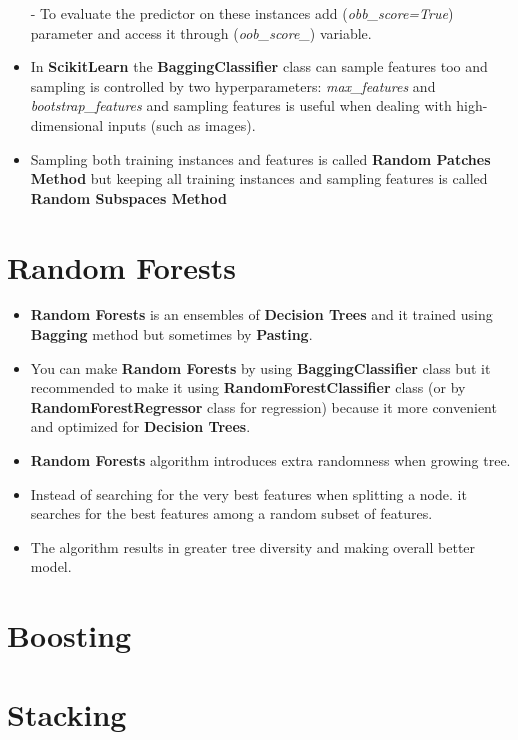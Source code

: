 \documentclass{article}
\begin{document}
\begin{itemize}
    	- To evaluate the predictor on these instances add (\textit{obb\_score=True}) parameter and access it through (\textit{oob\_score\_}) variable.
    	\item In \textbf{Scikit\textendash Learn} the \textbf{BaggingClassifier} class can sample features too and sampling is controlled by two hyperparameters: \textit{max\_features} and \textit{bootstrap\_features} and sampling features is useful when dealing with high-dimensional inputs (such as images).
    	\item Sampling both training instances and features is called \textbf{Random Patches Method} but keeping all training instances and sampling features is called \textbf{Random Subspaces Method}
    	
    \end{itemize}
    \section{Random Forests} 
    \begin{itemize}
		\item \textbf{Random Forests} is an ensembles of \textbf{Decision Trees} and it trained using \textbf{Bagging} method but sometimes by \textbf{Pasting}.
		\item You can make \textbf{Random Forests} by using \textbf{BaggingClassifier} class but it recommended to make it using \textbf{RandomForestClassifier} class (or by \textbf{RandomForestRegressor} class for regression) because it more convenient and optimized for \textbf{Decision Trees}.  
		\item \textbf{Random Forests} algorithm introduces extra randomness  when growing tree.
		\item Instead of searching for the very best features when splitting a node. it searches for the best features among a random subset of features. 
		\item The algorithm results in greater tree diversity and making overall better model.
		
    \end{itemize}
	\section{Boosting}
	\section{Stacking} 
\end{document}
